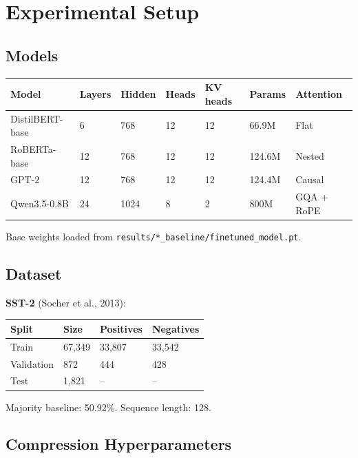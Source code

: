 
\section{Experimental Setup}

\subsection{Models}

\begin{table}[H]
\centering
\small
\begin{tabular}{lllllll}
\toprule
\textbf{Model} & \textbf{Layers} & \textbf{Hidden} & \textbf{Heads} & \textbf{KV heads} & \textbf{Params} & \textbf{Attention} \\
\midrule
DistilBERT-base & 6 & 768 & 12 & 12 & 66.9M & Flat \\
RoBERTa-base & 12 & 768 & 12 & 12 & 124.6M & Nested \\
GPT-2 & 12 & 768 & 12 & 12 & 124.4M & Causal \\
Qwen3.5-0.8B & 24 & 1024 & 8 & 2 & 800M & GQA + RoPE \\
\bottomrule
\end{tabular}
\end{table}

Base weights loaded from \texttt{results/*\_baseline/finetuned\_model.pt}.

\subsection{Dataset}

\textbf{SST-2} (Socher et al., 2013):

\begin{table}[H]
\centering
\small
\begin{tabular}{llll}
\toprule
\textbf{Split} & \textbf{Size} & \textbf{Positives} & \textbf{Negatives} \\
\midrule
Train & 67,349 & 33,807 & 33,542 \\
Validation & 872 & 444 & 428 \\
Test & 1,821 & -- & -- \\
\bottomrule
\end{tabular}
\end{table}

Majority baseline: 50.92\%. Sequence length: 128.

\subsection{Compression Hyperparameters}

